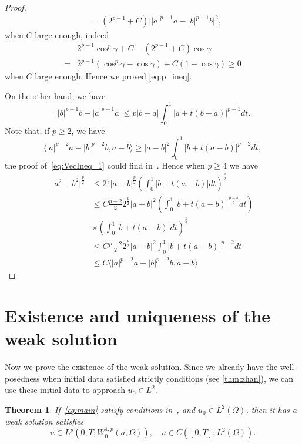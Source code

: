\documentclass[11pt]{amsart}
\newtheorem{theorem}{Theorem}[section]
\theoremstyle{definition}
\numberwithin{equation}{section}
\newcommand*\abs[1]{\lvert#1\rvert}
\begin{document}
\begin{proof}
\begin{equation}
\begin{split}
			&= \left(2^{p-1}+C\right)\abs{\abs{a}^{p-1}a - \abs{b}^{p-1}b}^2,
		\end{split}
	\end{equation}
	when $C$ large enough, indeed
	\begin{equation}
		\begin{split}
			& 2^{p-1}\cos^p{\gamma} + C - \left(2^{p-1}+C\right)\cos{\gamma}\\
			={} & 2^{p-1}\left(\cos^p{\gamma} - \cos{\gamma}\right) + C\left(1-\cos{\gamma}\right)
			\geq 0
		\end{split}
	\end{equation}
	when $C$ large enough. Hence we proved \cref{eq:p_ineq}.

	On the other hand, we have
	\begin{equation}
		\abs{\abs{b}^{p-1}b - \abs{a}^{p-1}a} \leq p\abs{b-a}\int_0^1 \abs{a + t(b - a)}^{p-1}dt.
	\end{equation}
	Note that, if $p \geq 2$, we have
	\begin{equation}\label{eq:VecIneq_1}
		\langle \abs{a}^{p-2}a - \abs{b}^{p-2}b, a-b\rangle
		\geq \abs{a-b}^2\int_0^1 \abs{b + t(a - b)}^{p-2}dt,
	\end{equation}
	the proof of~\cref{eq:VecIneq_1} could find in~\cite{lindqvistNotesStationaryPLaplace2019}.
	Hence when $p \geq 4$ we have
	\begin{equation}
		\begin{split}
			\abs{a^2 - b^2}^{\frac{p}{2}}
			&\leq 2^{\frac{p}{2}}\abs{a-b}^{\frac{p}{2}}
			\left(\int_0^1 \abs{b + t(a - b)}dt\right)^{\frac{p}{2}}\\
			&\leq C\frac{p-2}{2}2^{\frac{p}{2}}\abs{a-b}^2
			\left(\int_0^1 \abs{b + t(a - b)}^{\frac{p-4}{2}}dt\right)\\
			&\times\left(\int_0^1 \abs{b + t(a - b)}dt\right)^{\frac{p}{2}}\\
			&\leq C\frac{p-2}{2}2^{\frac{p}{2}}\abs{a-b}^2
			\int_0^1 \abs{b + t(a - b)}^{p-2}dt\\
			&\leq C \langle \abs{a}^{p-2}a - \abs{b}^{p-2}b, a-b\rangle
		\end{split}
	\end{equation}
\end{proof}

\section{Existence and uniqueness of the weak solution}\label{sec:Existence_and_uniqueness_of_the_weak_solution}
Now we prove the existence of the weak solution.
Since we already have the well-posedness when initial data
satisfied strictly conditions (see \cref{thm:zhan}),
we can use these
initial data to approach $u_0 \in L^2$.
\begin{theorem}\label{thm:absorb}
If~\cref{eq:main} satisfy conditions in~\cite[thm 1.3]{Zhan2019Uniquenessa}, and $u_0 \in L^2(\Omega) $, then it has a weak solution satisfies
\begin{equation}
u \in L^p(0, T; W_0^{1,p}(a,\Omega)), \quad u \in C([0, T]; L^2(\Omega)).
\end{equation}
\end{theorem}
\end{document}

